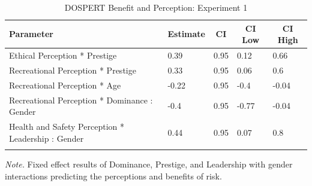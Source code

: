 \documentclass[
  donotrepeattitle,doc, 12pt, a4paper,floatsintext]{apa7}
\begin{document}
\begin{table}[h]

\begin{center}
\begin{threeparttable}

\caption{\label{tab:m4_perceivedRisk_Gender_exp_1}DOSPERT Benefit and Perception: Experiment 1}

\begin{tabular}{lllll}
\toprule
Parameter & \multicolumn{1}{c}{Estimate} & \multicolumn{1}{c}{CI} & \multicolumn{1}{c}{CI Low} & \multicolumn{1}{c}{CI High}\\
\midrule
Ethical Perception * Prestige & 0.39 & 0.95 & 0.12 & 0.66\\
Recreational Perception * Prestige & 0.33 & 0.95 & 0.06 & 0.6\\
Recreational Perception * Age & -0.22 & 0.95 & -0.4 & -0.04\\
Recreational Perception * Dominance : Gender & -0.4 & 0.95 & -0.77 & -0.04\\
Health and Safety Perception * Leadership : Gender & 0.44 & 0.95 & 0.07 & 0.8\\
\bottomrule
\addlinespace
\end{tabular}

\begin{tablenotes}[para]
\normalsize{\textit{Note.} Fixed effect results of Dominance, Prestige, and Leadership with gender interactions predicting the perceptions and benefits of risk.}
\end{tablenotes}

\end{threeparttable}
\end{center}

\end{table}
\end{document}
